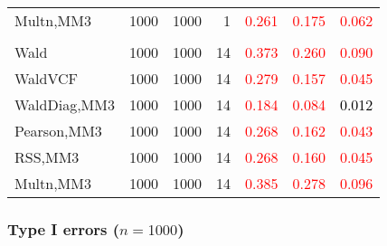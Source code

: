 \documentclass[
]{article}
\begin{document}
\begin{table}[H]
{\begin{tabular}[t]{lrrrrrr}
\hspace{1em}Multn,MM3 & 1000 & 1000 & 1 & \textcolor{red}{0.261} & \textcolor{red}{0.175} & \textcolor{red}{0.062}\\
\addlinespace[0.3em]
\multicolumn{7}{l}{\textbf{3F 15V}}\\
\hspace{1em}Wald & 1000 & 1000 & 14 & \textcolor{red}{0.373} & \textcolor{red}{0.260} & \textcolor{red}{0.090}\\
\hspace{1em}WaldVCF & 1000 & 1000 & 14 & \textcolor{red}{0.279} & \textcolor{red}{0.157} & \textcolor{red}{0.045}\\
\hspace{1em}WaldDiag,MM3 & 1000 & 1000 & 14 & \textcolor{red}{0.184} & \textcolor{red}{0.084} & \textcolor{black}{0.012}\\
\hspace{1em}Pearson,MM3 & 1000 & 1000 & 14 & \textcolor{red}{0.268} & \textcolor{red}{0.162} & \textcolor{red}{0.043}\\
\hspace{1em}RSS,MM3 & 1000 & 1000 & 14 & \textcolor{red}{0.268} & \textcolor{red}{0.160} & \textcolor{red}{0.045}\\
\hspace{1em}Multn,MM3 & 1000 & 1000 & 14 & \textcolor{red}{0.385} & \textcolor{red}{0.278} & \textcolor{red}{0.096}\\
\bottomrule
\end{tabular}}
\endgroup{}
\end{table}

\hypertarget{type-i-errors-n1000-1}{%
\subsubsection{\texorpdfstring{Type I errors
(\(n=1000\))}{Type I errors (n=1000)}}\label{type-i-errors-n1000-1}}
\end{document}
